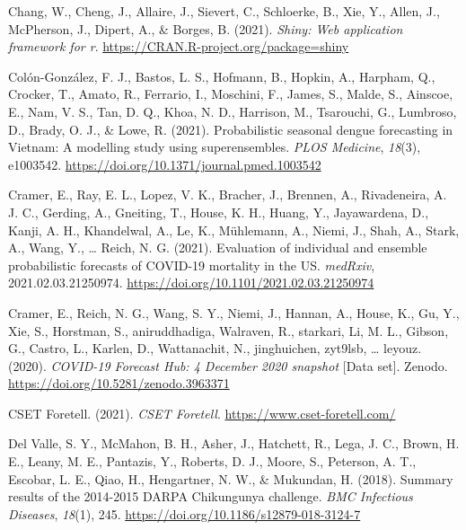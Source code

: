 \documentclass[
]{article}
\newlength{\cslhangindent}
\newlength{\cslentryspacingunit} %
\newenvironment{CSLReferences}[2] %
 {%
  \setlength{\parindent}{0pt}
  \ifodd #1
  \let\oldpar\par
  \def\par{\hangindent=\cslhangindent\oldpar}
  \fi
  \setlength{\parskip}{#2\cslentryspacingunit}
 }%
 {}
\begin{document}
\begin{CSLReferences}{1}{0}
\leavevmode{}%
Chang, W., Cheng, J., Allaire, J., Sievert, C., Schloerke, B., Xie, Y., Allen, J., McPherson, J., Dipert, A., \& Borges, B. (2021). \emph{Shiny: Web application framework for r}. \url{https://CRAN.R-project.org/package=shiny}

\leavevmode{}%
Colón-González, F. J., Bastos, L. S., Hofmann, B., Hopkin, A., Harpham, Q., Crocker, T., Amato, R., Ferrario, I., Moschini, F., James, S., Malde, S., Ainscoe, E., Nam, V. S., Tan, D. Q., Khoa, N. D., Harrison, M., Tsarouchi, G., Lumbroso, D., Brady, O. J., \& Lowe, R. (2021). Probabilistic seasonal dengue forecasting in {Vietnam}: A modelling study using superensembles. \emph{PLOS Medicine}, \emph{18}(3), e1003542. \url{https://doi.org/10.1371/journal.pmed.1003542}

\leavevmode{}%
Cramer, E., Ray, E. L., Lopez, V. K., Bracher, J., Brennen, A., Rivadeneira, A. J. C., Gerding, A., Gneiting, T., House, K. H., Huang, Y., Jayawardena, D., Kanji, A. H., Khandelwal, A., Le, K., Mühlemann, A., Niemi, J., Shah, A., Stark, A., Wang, Y., \ldots{} Reich, N. G. (2021). Evaluation of individual and ensemble probabilistic forecasts of {COVID}-19 mortality in the {US}. \emph{medRxiv}, 2021.02.03.21250974. \url{https://doi.org/10.1101/2021.02.03.21250974}

\leavevmode{}%
Cramer, E., Reich, N. G., Wang, S. Y., Niemi, J., Hannan, A., House, K., Gu, Y., Xie, S., Horstman, S., aniruddhadiga, Walraven, R., starkari, Li, M. L., Gibson, G., Castro, L., Karlen, D., Wattanachit, N., jinghuichen, zyt9lsb, \ldots{} leyouz. (2020). \emph{{COVID}-19 {Forecast Hub}: 4 {December} 2020 snapshot} {[}Data set{]}. {Zenodo}. \url{https://doi.org/10.5281/zenodo.3963371}

\leavevmode{}%
CSET Foretell. (2021). \emph{{CSET Foretell}}. \url{https://www.cset-foretell.com/}

\leavevmode{}%
Del Valle, S. Y., McMahon, B. H., Asher, J., Hatchett, R., Lega, J. C., Brown, H. E., Leany, M. E., Pantazis, Y., Roberts, D. J., Moore, S., Peterson, A. T., Escobar, L. E., Qiao, H., Hengartner, N. W., \& Mukundan, H. (2018). Summary results of the 2014-2015 {DARPA Chikungunya} challenge. \emph{BMC Infectious Diseases}, \emph{18}(1), 245. \url{https://doi.org/10.1186/s12879-018-3124-7}


\end{CSLReferences}
\end{document}

